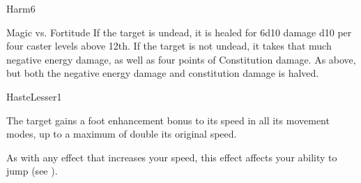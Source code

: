 \begin{spellsection}{Harm}{6}
\begin{spellheader}
\end{spellheader}
\begin{spellcontent}
    \begin{spelltargetinginfo}
    \end{spelltargetinginfo}
    \begin{spelleffects}
        \begin{spellattack}{Magic vs. Fortitude}
            \spelleffect If the target is undead, it is healed for 6d10 damage \add d10 per four caster levels above 12th.
            \spellsuccess If the target is not undead, it takes that much negative energy damage, as well as four points of Constitution damage.
            \spellfailure As above, but both the negative energy damage and constitution damage is halved.
        \end{spellattack}
    \end{spelleffects}
\end{spellcontent}
\begin{spellfooter}
\end{spellfooter}
\end{spellsection}

\begin{spellsection}{Haste}{Lesser}{1}
\begin{spellheader}
\end{spellheader}
\begin{spellcontent}
    \begin{spelltargetinginfo}
    \end{spelltargetinginfo}
    \begin{spelleffects}
        \spelleffect The target gains a  foot enhancement bonus to its speed in all its movement modes, up to a maximum of double its original speed.
        \spelldur \durshort \dismissable
    \end{spelleffects}
\end{spellcontent}
\begin{spellfooter}
    \spellnotes As with any effect that increases your speed, this effect affects your ability to jump (see ).
\end{spellfooter}
\end{spellsection}


